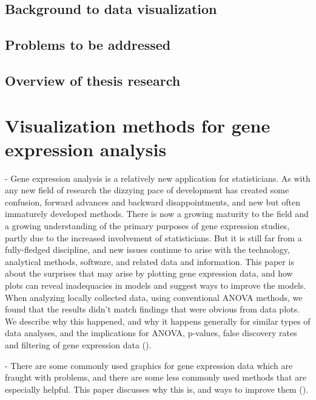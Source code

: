 \documentclass[11pt,a4paper,oldfontcommands,openany]{memoir}
\numberwithin{equation}{section} %
\begin{document}
\section{Background to data visualization}

\lipsum[1]

\section{Problems to be addressed}

\lipsum[2]

\section{Overview of thesis research}
\label{sec:helpSection}


\chapter{Visualization methods for gene expression analysis}

- Gene expression analysis is a relatively new application for statisticians. As with any new field of research the dizzying pace of development has created some confusion, forward advances and backward disappointments, and new but often immaturely developed methods. There is now a growing maturity to the field and a growing understanding of the primary purposes of gene expression studies, partly due to the increased involvement of statisticians. But it is still far from a fully-fledged discipline, and new issues continue to arise with the technology, analytical methods, software, and related data and information. This paper is about the surprises that may arise by plotting gene expression data, and how plots can reveal inadequacies in models and suggest ways to improve the models. When analyzing locally collected data, using conventional ANOVA methods, we found that the results didn’t match findings that were obvious from data plots. We describe why this happened, and why it happens generally for similar types of data analyses, and the implications for ANOVA, p-values, false discovery rates and filtering of gene expression data (\citealt{jds}).

- There are some commonly used graphics for gene expression data which are fraught with problems, and there are some less commonly used methods that are especially helpful. This paper discusses why this is, and ways to improve them (\citealt{jds}).
\end{document}
